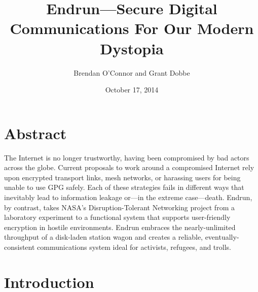 \documentclass[12pt]{article}
\title{Endrun---Secure Digital Communications For Our Modern Dystopia}
\author{Brendan O'Connor and Grant Dobbe}
\date{October 17, 2014}
\begin{document}
	
	
	\maketitle
  
  \section{Abstract}
  
  The Internet is no longer trustworthy, having been compromised by bad actors across the globe. Current proposals to work around a compromised Internet rely upon encrypted transport links, mesh networks, or harassing users for being unable to use GPG safely. Each of these strategies fails in different ways that inevitably lead to information leakage or---in the extreme case---death. Endrun, by contrast, takes NASA's Disruption-Tolerant Networking project from a laboratory experiment to a functional system that supports user-friendly encryption in hostile environments. Endrun embraces the nearly-unlimited throughput of a disk-laden station wagon and creates a reliable, eventually-consistent communications system ideal for activists, refugees, and trolls.
	
	\section{Introduction}
	
\end{document}

